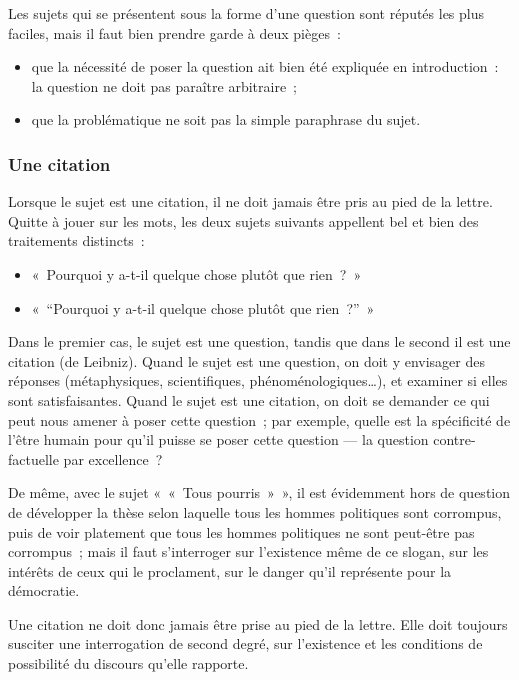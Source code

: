 \documentclass[a4paper,12pt]{article}
\begin{document}
Les sujets qui se présentent sous la forme d'une question sont réputés
les plus faciles, mais il faut bien prendre garde à deux pièges :

\begin{itemize}
\item que la nécessité de poser la question ait bien été expliquée en
introduction : la question ne doit pas paraître arbitraire ;

\item que la problématique ne soit pas la simple paraphrase du sujet.
\end{itemize}

\subsubsection{Une citation}
\label{sec-2-3-4}

Lorsque le sujet est une citation, il ne doit jamais être pris au pied
de la lettre. Quitte à jouer sur les mots, les deux sujets suivants
appellent bel et bien des traitements distincts :

\begin{itemize}
\item « Pourquoi y a-t-il quelque chose plutôt que rien ? »

\item « ``Pourquoi y a-t-il quelque chose plutôt que rien ?'' »
\end{itemize}

Dans le premier cas, le sujet est une question, tandis que dans le
second il est une citation (de Leibniz). Quand le sujet est une
question, on doit y envisager des réponses (métaphysiques,
scientifiques, phénoménologiques\ldots{}), et examiner si elles sont
satisfaisantes. Quand le sujet est une citation, on doit se demander ce
qui peut nous amener à poser cette question ; par exemple, quelle est la
spécificité de l'être humain pour qu'il puisse se poser cette question
--- la question contre-factuelle par excellence ?

De même, avec le sujet « « Tous pourris » », il est évidemment hors de
question de développer la thèse selon laquelle tous les hommes
politiques sont corrompus, puis de voir platement que tous les hommes
politiques ne sont peut-être pas corrompus ; mais il faut s'interroger
sur l'existence même de ce slogan, sur les intérêts de ceux qui le
proclament, sur le danger qu'il représente pour la démocratie.

Une citation ne doit donc jamais être prise au pied de la lettre. Elle
doit toujours susciter une interrogation de second degré, sur
l'existence et les conditions de possibilité du discours qu'elle
rapporte.
\end{document}
